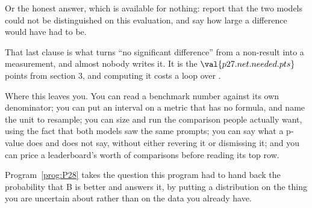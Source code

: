 \begin{fr}
\begin{ansblock}
Or the honest answer, which is available for nothing: report that the two
models could not be distinguished on this evaluation, and say how large a
difference would have had to be.
\end{ansblock}

That last clause is what turns \enquote{no significant difference} from a
non-result into a measurement, and almost nobody writes it. It is the
$\val{p27.net.needed.pts}$ points from section 3, and computing it costs a
loop over .

Where this leaves you. You can read a benchmark number against its own
denominator; you can put an interval on a metric that has no formula, and
name the unit to resample; you can size and run the comparison people
actually want, using the fact that both models saw the same prompts; you can
say what a p-value does and does not say, without either revering it or
dismissing it; and you can price a leaderboard's worth of comparisons before
reading its top row.

Program~\ref{prog:P28} takes the question this program had to hand back
\dash{} the probability that B is better \dash{} and answers it, by putting a
distribution on the thing you are uncertain about rather than on the data you
already have.
\end{fr}

